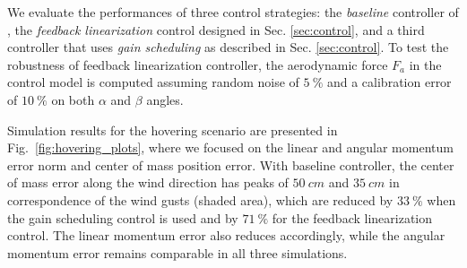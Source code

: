 

We evaluate the performances of three control strategies: the \emph{baseline} controller of \cite{c1}\cite{c2}, the \emph{feedback linearization} control designed in Sec. \ref{sec:control}, and a third controller that uses \emph{gain scheduling} as described in Sec. \ref{sec:control}. To test the robustness of feedback linearization controller, the aerodynamic force $F_a$ in the control model is computed assuming random noise of $\SI{5}{\%}$ and a calibration error of $\SI{10}{\%}$ on both $\alpha$ and $\beta$ angles.

Simulation results for the hovering scenario are presented in Fig.~\ref{fig:hovering_plots}, where we focused on the linear and angular momentum error norm and center of mass position error. With baseline controller, the center of mass error along the wind direction has peaks of $\SI{50}{cm}$ and $\SI{35}{cm}$ in correspondence of the wind gusts (shaded area), which are reduced by $\SI{33}{\%}$ when the gain scheduling control is used and by $\SI{71}{\%}$ for the feedback linearization control. The linear momentum error also reduces accordingly, while the angular momentum error remains comparable in all three simulations.

